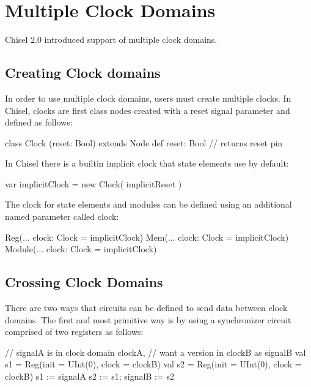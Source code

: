 \documentclass[10pt,twocolumn]{article}
\begin{document}
\section{Multiple Clock Domains}

Chisel 2.0 introduced support of multiple clock domains.  

\subsection{Creating Clock domains}

In order to use multiple clock domains, users must create multiple clocks.  
In Chisel, clocks are first class nodes created with a reset signal parameter and defined as follows:

\begin{scala}
class Clock (reset: Bool) extends Node {
  def reset: Bool // returns reset pin
}
\end{scala}

\noindent
In Chisel there is a builtin implicit clock that state elements use by default:

\begin{scala}
var implicitClock = new Clock( implicitReset )
\end{scala}

The clock for state elements and modules can be defined using an additional named parameter called clock:

\begin{scala}
Reg(... clock: Clock = implicitClock)
Mem(... clock: Clock = implicitClock)
Module(... clock: Clock = implicitClock)
\end{scala}

\subsection{Crossing Clock Domains}

There are two ways that circuits can be defined to send data between clock domains.
The first and most primitive way is by using a synchronizer circuit comprised of two registers as follows:

\begin{scala}
// signalA is in clock domain clockA, 
// want a version in clockB as signalB
val s1 = Reg(init = UInt(0), clock = clockB)
val s2 = Reg(init = UInt(0), clock = clockB)
s1      := signalA
s2      := s1; 
signalB := s2
\end{scala}
\end{document}
